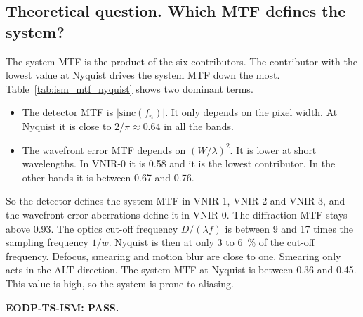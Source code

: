 \subsection{Theoretical question. Which MTF defines the system?}
The system MTF is the product of the six contributors.
The contributor with the lowest value at Nyquist drives the system MTF down the most.
Table~\ref{tab:ism_mtf_nyquist} shows two dominant terms.
\begin{itemize}
\item The detector MTF is $|\mathrm{sinc}(f_n)|$. It only depends on the pixel width. At Nyquist it is close to $2/\pi \approx 0.64$ in all the bands.
\item The wavefront error MTF depends on $(W/\lambda)^2$. It is lower at short wavelengths. In VNIR-0 it is 0.58 and it is the lowest contributor. In the other bands it is between 0.67 and 0.76.
\end{itemize}
So the detector defines the system MTF in VNIR-1, VNIR-2 and VNIR-3, and the wavefront error aberrations define it in VNIR-0.
The diffraction MTF stays above 0.93. The optics cut-off frequency $D/(\lambda f)$ is between 9 and 17 times the sampling frequency $1/w$. Nyquist is then at only 3 to 6~\% of the cut-off frequency.
Defocus, smearing and motion blur are close to one. Smearing only acts in the ALT direction.
The system MTF at Nyquist is between 0.36 and 0.45. This value is high, so the system is prone to aliasing.


\textbf{EODP-TS-ISM: PASS.}
